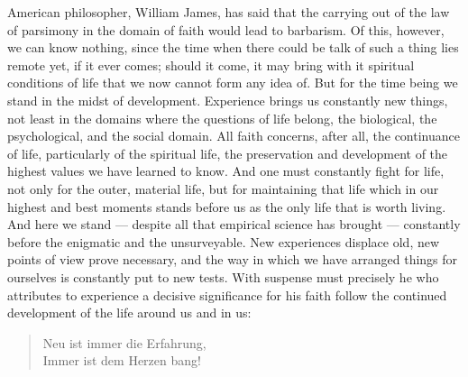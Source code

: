 \documentclass[12pt,a4paper,openany]{book}
\newcommand{\opage}[1]{\marginnote{\footnotesize\textit{[#1]}}}
\begin{document}
American philosopher, William James, has said that
the carrying out of the law of parsimony in the domain of faith
\opage{220}would lead to barbarism. Of this, however, we can know nothing, since the
time when there could be talk of such a thing lies remote
yet, if it ever comes; should it come, it
may bring with it spiritual conditions of life that we now
cannot form any idea of. But for the time being we stand
in the midst of development. Experience brings us constantly new things,
not least in the domains where the questions of life belong,
the biological, the psychological, and the social
domain. All faith concerns, after all, the continuance of life, particularly of the spiritual
life, the preservation and development of the highest
values we have learned to know. And one must constantly fight
for life, not only for the outer, material life, but for
maintaining that life which in our highest and best moments stands
before us as the only life that is worth living. And here
we stand --- despite all that empirical science has brought ---
constantly before the enigmatic and the unsurveyable. New
experiences displace old, new points of view prove
necessary, and the way in which we have arranged things
for ourselves is constantly put to new tests. With suspense must
precisely he who attributes to experience a decisive significance
for his faith follow the continued development of the life around
us and in us:

\begin{verse}
Neu ist immer die Erfahrung, \\
Immer ist dem Herzen bang!
\end{verse}
\end{document}
